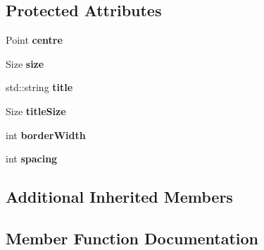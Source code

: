 \subsection*{Protected Attributes}
\begin{DoxyCompactItemize}
\item 
Point {\bfseries centre}\hypertarget{class_view_1_1_rectangle_shape_a12930d710b0629b49c95c86d686291a3}{}\label{class_view_1_1_rectangle_shape_a12930d710b0629b49c95c86d686291a3}

\item 
Size {\bfseries size}\hypertarget{class_view_1_1_rectangle_shape_a92563881c24a730b99d600b39558ebfc}{}\label{class_view_1_1_rectangle_shape_a92563881c24a730b99d600b39558ebfc}

\item 
std\+::string {\bfseries title}\hypertarget{class_view_1_1_rectangle_shape_af9f808c588d4c618d857dcd46e27073f}{}\label{class_view_1_1_rectangle_shape_af9f808c588d4c618d857dcd46e27073f}

\item 
Size {\bfseries title\+Size}\hypertarget{class_view_1_1_rectangle_shape_aff10ae7e56d55aca3f4accd7386e6e4f}{}\label{class_view_1_1_rectangle_shape_aff10ae7e56d55aca3f4accd7386e6e4f}

\item 
int {\bfseries border\+Width}\hypertarget{class_view_1_1_rectangle_shape_ac32ad0276db89433370ad4a50752b734}{}\label{class_view_1_1_rectangle_shape_ac32ad0276db89433370ad4a50752b734}

\item 
int {\bfseries spacing}\hypertarget{class_view_1_1_rectangle_shape_ab2330833ac41ecb5233ce20728450a7b}{}\label{class_view_1_1_rectangle_shape_ab2330833ac41ecb5233ce20728450a7b}

\end{DoxyCompactItemize}
\subsection*{Additional Inherited Members}


\subsection{Member Function Documentation}
